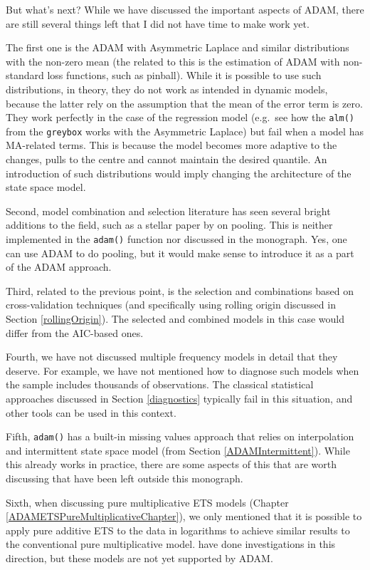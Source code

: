 \documentclass[]{book}
\theoremstyle{definition}
\theoremstyle{definition}
\theoremstyle{definition}
\theoremstyle{definition}
\theoremstyle{remark}
\begin{document}
But what's next? While we have discussed the important aspects of ADAM, there are still several things left that I did not have time to make work yet.

The first one is the ADAM with Asymmetric Laplace and similar distributions with the non-zero mean (the related to this is the estimation of ADAM with non-standard loss functions, such as pinball). While it is possible to use such distributions, in theory, they do not work as intended in dynamic models, because the latter rely on the assumption that the mean of the error term is zero. They work perfectly in the case of the regression model (e.g.~see how the \texttt{alm()} from the \texttt{greybox} works with the Asymmetric Laplace) but fail when a model has MA-related terms. This is because the model becomes more adaptive to the changes, pulls to the centre and cannot maintain the desired quantile. An introduction of such distributions would imply changing the architecture of the state space model.

Second, model combination and selection literature has seen several bright additions to the field, such as a stellar paper by \citet{Kourentzes2019c} on pooling. This is neither implemented in the \texttt{adam()} function nor discussed in the monograph. Yes, one can use ADAM to do pooling, but it would make sense to introduce it as a part of the ADAM approach.

Third, related to the previous point, is the selection and combinations based on cross-validation techniques (and specifically using rolling origin discussed in Section \ref{rollingOrigin}). The selected and combined models in this case would differ from the AIC-based ones.

Fourth, we have not discussed multiple frequency models in detail that they deserve. For example, we have not mentioned how to diagnose such models when the sample includes thousands of observations. The classical statistical approaches discussed in Section \ref{diagnostics} typically fail in this situation, and other tools can be used in this context.

Fifth, \texttt{adam()} has a built-in missing values approach that relies on interpolation and intermittent state space model (from Section \ref{ADAMIntermittent}). While this already works in practice, there are some aspects of this that are worth discussing that have been left outside this monograph.

Sixth, when discussing pure multiplicative ETS models (Chapter \ref{ADAMETSPureMultiplicativeChapter}), we only mentioned that it is possible to apply pure additive ETS to the data in logarithms to achieve similar results to the conventional pure multiplicative model. \citet{Akram2009} have done investigations in this direction, but these models are not yet supported by ADAM.
\end{document}
